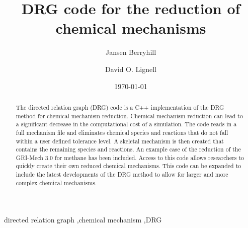 \documentclass[review,3p]{elsarticle}
\begin{document}


\title{DRG code for the reduction of chemical mechanisms} 

\author[byu]{Jansen Berryhill}
\author[byu]{David O. Lignell}

\address[byu]{350 CB, Brigham Young University, Provo, UT 84602, USA}


\date{\today}



\begin{abstract}
The directed relation graph (DRG) code is a C++ implementation of the DRG method for chemical mechanism reduction. Chemical mechanism reduction can lead to a significant decrease in the computational cost of a simulation. The code reads in a full mechanism file and eliminates chemical species and reactions that do not fall within a user defined tolerance level. A skeletal mechanism is then created that contains the remaining species and reactions. An example case of the reduction of the GRI-Mech 3.0 for methane has been included. Access to this code allows researchers to quickly create their own reduced chemical mechanisms. This code can be expanded to include the latest developments of the DRG method to allow for larger and more complex chemical mechanisms.  %

\end{abstract}

\begin{keyword} 
directed relation graph \sep chemical mechanism \sep DRG
\end{keyword}


\maketitle     

\end{document}
